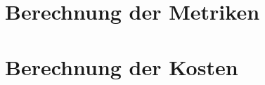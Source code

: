 \documentclass[a4paper,11pt]{report}
\begin{document}
\section{Berechnung der Metriken}\label{sec:code_metrics}


\section{Berechnung der Kosten}\label{sec:code_kosten}


% 
\end{document}
